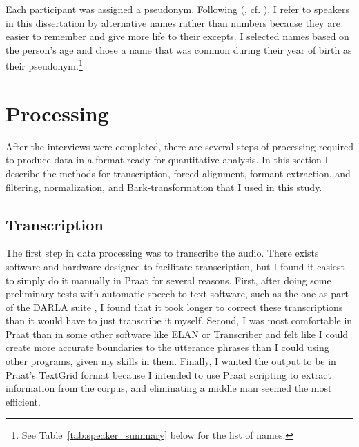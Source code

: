 Each participant was assigned a pseudonym. Following \citeauthor{tagliamonte_2006} (\citeyear[51]{tagliamonte_2006}, cf. \citealt[253--254]{schlling_2013}), I refer to speakers in this dissertation by alternative names rather than numbers because they are easier to remember and give more life to their excepts. I selected names based on the person’s age and chose a name that was common during their year of birth as their pseudonym.\footnote{See Table~\ref{tab:speaker_summary} below for the list of names.}




\section{Processing}
\label{processing}

After the interviews were completed, there are several steps of processing required to produce data in a format ready for quantitative analysis. In this section I describe the methods for transcription, forced alignment, formant extraction, and filtering, normalization, and Bark-transformation that I used in this study.

\subsection{Transcription}
\label{transcription}

The first step in data processing was to transcribe the audio. There exists software and hardware designed to facilitate transcription, but I found it easiest to simply do it manually in Praat \citep{boersma_weenink_2018_praat} for several reasons. First, after doing some preliminary tests with automatic speech-to-text software, such as the one as part of the DARLA suite \citep{reddy_stanford_2015_DARLA}, I found that it took longer to correct these transcriptions than it would have to just transcribe it myself. Second, I was most comfortable in Praat than in some other software like ELAN or Transcriber and felt like I could create more accurate boundaries to the utterance phrases than I could using other programs, given my skills in them. Finally, I wanted the output to be in Praat’s TextGrid format because I intended to use Praat scripting to extract information from the corpus, and eliminating a middle man seemed the most efficient.

